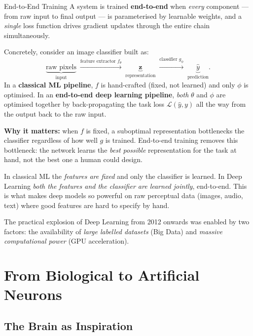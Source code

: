 \documentclass[11pt,a4paper]{article}
\begin{document}
\begin{defbox}{End-to-End Training}
A system is trained \textbf{end-to-end} when \emph{every} component — from raw input to final output — is
parameterised by learnable weights, and a \emph{single} loss function drives gradient updates through the
entire chain simultaneously.

Concretely, consider an image classifier built as:
\[
  \underbrace{\text{raw pixels}}_{\text{input}}
  \;\xrightarrow{\text{feature extractor } f_\theta}\;
  \underbrace{\mathbf{z}}_{\text{representation}}
  \;\xrightarrow{\text{classifier } g_\phi}\;
  \underbrace{\hat{y}}_{\text{prediction}}.
\]
In a \textbf{classical ML pipeline}, $f$ is hand-crafted (fixed, not learned) and only $\phi$ is
optimised.  In an \textbf{end-to-end deep learning pipeline}, \emph{both} $\theta$ and $\phi$ are
optimised together by back-propagating the task loss $\mathcal{L}(\hat{y}, y)$ all the way from the
output back to the raw input.

\textbf{Why it matters:} when $f$ is fixed, a suboptimal representation bottlenecks the classifier
regardless of how well $g$ is trained.  End-to-end training removes this bottleneck: the network
learns the \emph{best possible} representation for the task at hand, not the best one a human could
design.
\end{defbox}

\begin{insightbox}
In classical ML the \emph{features are fixed} and only the classifier is learned. In Deep Learning \emph{both the features and the classifier are learned jointly}, end-to-end. This is what makes deep models so powerful on raw perceptual data (images, audio, text) where good features are hard to specify by hand.
\end{insightbox}

The practical explosion of Deep Learning from 2012 onwards was enabled by two factors: the availability of \emph{large labelled datasets} (Big Data) and \emph{massive computational power} (GPU acceleration).

\section{From Biological to Artificial Neurons}

\subsection{The Brain as Inspiration}
\end{document}
